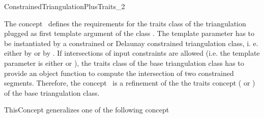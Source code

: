 

\begin{ccRefConcept}{ConstrainedTriangulationPlusTraits_2}


\ccDefinition
  
The concept \ccRefName\ defines the requirements for the traits
class of the triangulation 
plugged as first template argument of the class
.
The template parameter  has to be instantiated
by a constrained or Delaunay constrained triangulation
class, i. e. either by
or by .
If intersections of input constraints are allowed
(i.e. the  template parameter
is either   or
),  the traits
 class    of the base triangulation class
has to provide
an object function to compute the intersection of two
constrained segments. Therefore, the concept
\ccRefName\ is a refinement of the
the traits  concept
( or )
of the base triangulation  class.

\ccGeneralizes

ThisConcept generalizes one of the following concept\\
 \\


\ccTypes





\end{ccRefConcept}
